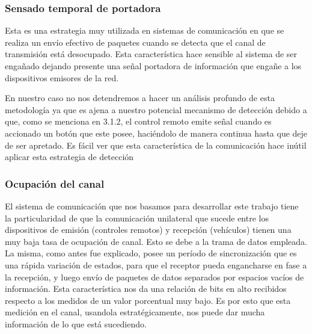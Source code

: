 \subsubsection{Sensado temporal de portadora}

Esta es una estrategia muy utilizada en sistemas de comunicación en que se realiza un envío efectivo de paquetes cuando se detecta que el canal 
de transmisión está desocupado. Esta característica hace sensible al sistema de ser engañado dejando presente una señal portadora de información
que engañe a los dispositivos emisores de la red.\par
En nuestro caso no nos detendremos a hacer un análisis profundo de esta metodología ya que es ajena a nuestro potencial mecanismo de detección
debido a que, como se menciona en 3.1.2, el control remoto emite señal cuando es accionado un botón que este posee, haciéndolo de manera continua
hasta que deje de ser apretado. Es fácil ver que esta característica de la comunicación hace inútil aplicar esta estrategia de detección

\subsubsection{Ocupación del canal}

El sistema de comunicación que nos basamos para desarrollar este trabajo tiene la particularidad de que la comunicación unilateral que sucede
entre los dispositivos de emisión (controles remotos) y recepción (vehículos) tienen una muy baja tasa de ocupación de canal. Esto se debe a 
la trama de datos empleada. La misma, como antes fue explicado, posee un período de sincronización que es una rápida variación de estados, para
que el receptor pueda engancharse en fase a la recepción, y luego envío de paquetes de datos separados por espacios vacíos de información. Esta
característica nos da una relación de bits en alto recibidos respecto a los medidos de un valor porcentual muy bajo. Es por esto que esta medición
en el canal, usandola estratégicamente, nos puede dar mucha información de lo que está sucediendo.
